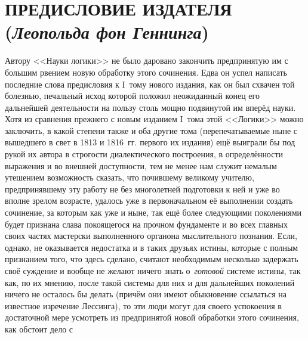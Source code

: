 
\section[\mdseries Предисловие издателя (Леопольда фон Геннинга)]%
{ПРЕДИСЛОВИЕ ИЗДАТЕЛЯ\\({\em Леопольда фон Геннинга\/})}

Автору <<Науки логики>> не было даровано закончить предпринятую им с большим
рвением новую обработку этого сочинения. Едва он успел написать последние
слова предисловия к I~тому нового издания, как он был схвачен той болезнью,
печальный исход которой положил неожиданный конец его дальнейшей
деятельности на пользу столь мощно подвинутой им вперёд науки. Хотя из
сравнения прежнего с новым изданием I~тома этой <<Логики>> можно заключить, в
какой степени также и оба другие тома (перепечатываемые ныне с вышедшего в
свет в 1813 и 1816~гг. первого их издания) ещё выиграли бы под рукой их
автора в строгости диалектического построения, в определённости выражения и
во внешней доступности, тем не менее нам служит немалым утешением
возможность сказать, что почившему великому учителю, предпринявшему эту
работу не без многолетней подготовки к ней и уже во вполне зрелом возрасте,
удалось уже в первоначальном её выполнении создать сочинение, за которым
как уже и ныне, так ещё более следующими поколениями будет признана слава
покоящегося на прочном фундаменте и во всех главных своих частях мастерски
выполненного органона мыслительного познания. Если, однако, не оказывается
недостатка и в таких друзьях истины, которые с полным признанием того, что
здесь сделано, считают необходимым несколько задержать своё суждение и
вообще не желают ничего знать о~{\em готовой} системе
истины, так как, по их мнению, после такой системы для них и для дальнейших
поколений ничего не осталось бы делать (причём они имеют обыкновение
ссылаться на известное изречение Лессинга), то эти люди могут для своего успокоения в достаточной мере
усмотреть из предпринятой новой обработки этого сочинения, как обстоит дело с
